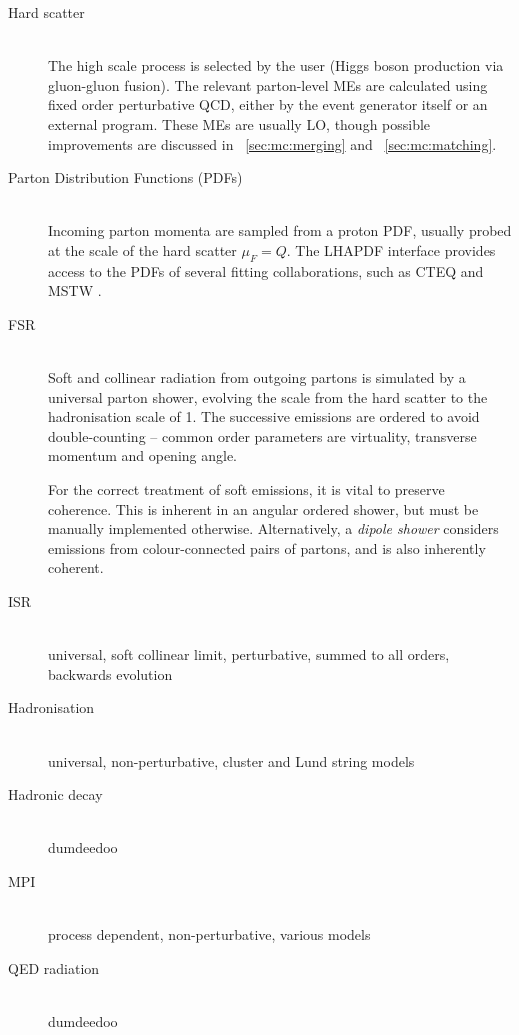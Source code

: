 \begin{description}
\item[Hard scatter] \hfill \\
	The high scale process is selected by the user (\eg Higgs boson production via 
	gluon-gluon fusion). The relevant parton-level \acp{ME} are calculated using fixed 
	order perturbative QCD, either by the event generator itself or an external program. 
	These \acp{ME} are usually \ac{LO}, though possible improvements are discussed in 
	\Section~\ref{sec:mc:merging} and \Section~\ref{sec:mc:matching}.
\item[Parton Distribution Functions (PDFs)] \hfill \\
	Incoming parton momenta are sampled from a proton \ac{PDF}, usually probed at the 
	scale of the hard scatter $\mu_F = Q$. The LHAPDF interface \cite{LHAPDF} provides 
	access to the \acp{PDF} of several fitting collaborations, such as CTEQ \cite{CTEQ} 
	and MSTW \cite{MSTW}.
\item[\ac{FSR}] \hfill \\
	Soft and collinear radiation from outgoing partons is simulated by a universal parton 
	shower, evolving the scale from the hard scatter to the hadronisation scale of 
	\about\unit{1}{\GeV}. The successive emissions are ordered to avoid double-counting -- 
	common order parameters are virtuality, transverse momentum and opening angle.

	For the correct treatment of soft emissions, it is vital to preserve coherence. This 
	is inherent in an angular ordered shower, but must be manually implemented otherwise. 
	Alternatively, a \textit{dipole shower} considers emissions from colour-connected 
	pairs of partons, and is also inherently coherent.
\item[\ac{ISR}] \hfill \\
	universal, soft collinear limit, perturbative, summed to all orders, backwards evolution
\item[Hadronisation] \hfill \\
	universal, non-perturbative, cluster and Lund string models
\item[Hadronic decay] \hfill \\
	dumdeedoo
\item[\ac{MPI}] \hfill \\
	process dependent, non-perturbative, various models
\item[\acs{QED} radiation] \hfill \\
	dumdeedoo
\end{description}

